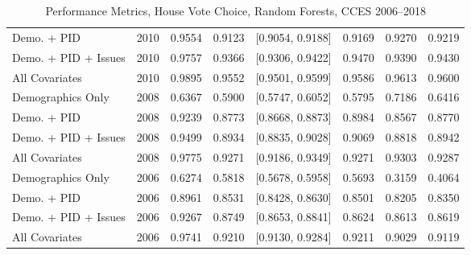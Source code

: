 \begin{table}[H]
\begin{tabular}{lrrrlrrr}
  Demo. + PID & 2010 & 0.9554 & 0.9123 & [0.9054, 0.9188] & 0.9169 & 0.9270 & 0.9219 \\ 
  Demo. + PID + Issues & 2010 & 0.9757 & 0.9366 & [0.9306, 0.9422] & 0.9470 & 0.9390 & 0.9430 \\ 
  All Covariates & 2010 & 0.9895 & 0.9552 & [0.9501, 0.9599] & 0.9586 & 0.9613 & 0.9600 \\ 
  Demographics Only & 2008 & 0.6367 & 0.5900 & [0.5747, 0.6052] & 0.5795 & 0.7186 & 0.6416 \\ 
  Demo. + PID & 2008 & 0.9239 & 0.8773 & [0.8668, 0.8873] & 0.8984 & 0.8567 & 0.8770 \\ 
  Demo. + PID + Issues & 2008 & 0.9499 & 0.8934 & [0.8835, 0.9028] & 0.9069 & 0.8818 & 0.8942 \\ 
  All Covariates & 2008 & 0.9775 & 0.9271 & [0.9186, 0.9349] & 0.9271 & 0.9303 & 0.9287 \\ 
  Demographics Only & 2006 & 0.6274 & 0.5818 & [0.5678, 0.5958] & 0.5693 & 0.3159 & 0.4064 \\ 
  Demo. + PID & 2006 & 0.8961 & 0.8531 & [0.8428, 0.8630] & 0.8501 & 0.8205 & 0.8350 \\ 
  Demo. + PID + Issues & 2006 & 0.9267 & 0.8749 & [0.8653, 0.8841] & 0.8624 & 0.8613 & 0.8619 \\ 
  All Covariates & 2006 & 0.9741 & 0.9210 & [0.9130, 0.9284] & 0.9211 & 0.9029 & 0.9119 \\ 
   \bottomrule
\end{tabular}
\caption{Performance Metrics, House Vote Choice, Random Forests, CCES 2006--2018} 
\label{tab:cces_house_rf}
\end{table}
